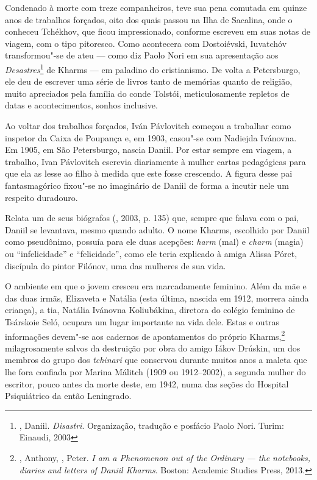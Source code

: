 Condenado à morte com treze companheiros, teve sua pena comutada
em quinze anos de trabalhos forçados, oito dos quais passou na
Ilha de Sacalina, onde o conheceu Tchékhov, que ficou impressionado,
conforme escreveu em suas notas de viagem, com o tipo pitoresco.
Como acontecera com Dostoiévski, Iuvatchóv transformou"-se de ateu
--- como diz Paolo Nori em sua apresentação aos
\emph{Desastres}\footnote{, Daniil.
\emph{Disastri}. Organização, tradução e posfácio Paolo Nori.
Turim: Einaudi, 2003} de Kharms --- em paladino do cristianismo.
De volta a Petersburgo, ele deu de escrever uma série de livros
tanto de memórias quanto de religião, muito apreciados pela
família do conde Tolstói, meticulosamente repletos de datas e
acontecimentos, sonhos inclusive.

Ao voltar dos trabalhos forçados, Iván Pávlovitch começou a
trabalhar como inspetor da Caixa de Poupança e, em 1903, casou"-se
com Nadiejda Ivánovna. Em 1905, em São Petersburgo, nascia Daniil.
Por estar sempre em viagem, a trabalho, Ivan Pávlovitch escrevia
diariamente à mulher cartas pedagógicas para que ela as lesse ao
filho à medida que este fosse crescendo. A figura desse pai
fantasmagórico fixou"-se no imaginário de Daniil de forma a
incutir nele um respeito duradouro.

Relata um de seus biógrafos (, 2003, p. 135) que, sempre
que falava com o pai, Daniil se levantava, mesmo quando adulto.
O nome Kharms, escolhido por Daniil como pseudônimo, possuía para
ele duas acepções: \emph{harm} (mal) e \emph{charm} (magia) ou
``infelicidade'' e ``felicidade'', como ele teria explicado à
amiga Alissa Póret, discípula do pintor Filónov, uma das mulheres
de sua vida.

O ambiente em que o jovem cresceu era marcadamente feminino. Além
da mãe e das duas irmãs, Elizaveta e Natália (esta última, nascida
em 1912, morrera ainda criança), a tia, Natália Ivánovna Koliubákina,
diretora do colégio feminino de Tsárskoie Seló, ocupara um lugar
importante na vida dele. Estas e outras informações devem"-se aos
cadernos de apontamentos do próprio Kharms,\footnote{,
Anthony, , Peter. \emph{I am a Phenomenon out of the
Ordinary --- the notebooks, diaries and letters of Daniil Kharms}.
Boston: Academic Studies Press, 2013.} milagrosamente salvos da
destruição por obra do amigo Iákov Drúskin, um dos membros do
grupo dos \emph{tchinari} que conservou durante muitos anos a maleta
que lhe fora confiada por Marina Málitch (1909 ou 1912--2002), a
segunda mulher do escritor, pouco antes da morte deste, em 1942,
numa das seções do Hospital Psiquiátrico da então Leningrado.

